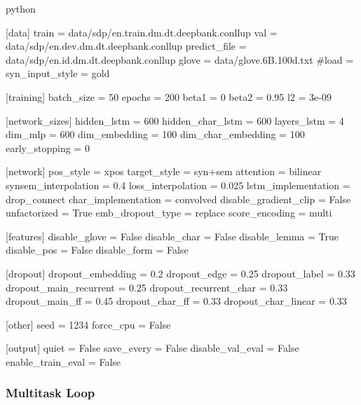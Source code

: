 \documentclass[11pt]{scrartcl}
\begin{document}
\begin{mintedbox}{python}

[data]
train                  = data/sdp/en.train.dm.dt.deepbank.conllup
val                    = data/sdp/en.dev.dm.dt.deepbank.conllup
predict_file           = data/sdp/en.id.dm.dt.deepbank.conllup
glove                  = data/glove.6B.100d.txt
#load                   = 
syn_input_style        = gold

[training]
batch_size             = 50
epochs                 = 200
beta1                  = 0
beta2                  = 0.95
l2                     = 3e-09

[network_sizes]
hidden_lstm            = 600
hidden_char_lstm       = 600
layers_lstm            = 4
dim_mlp                = 600
dim_embedding          = 100
dim_char_embedding     = 100
early_stopping         = 0

[network]
pos_style              = xpos
target_style           = syn+sem 
attention              = bilinear
synsem_interpolation   = 0.4
loss_interpolation     = 0.025
lstm_implementation    = drop_connect
char_implementation    = convolved
disable_gradient_clip  = False
unfactorized           = True
emb_dropout_type       = replace
score_encoding         = multi

[features]
disable_glove          = False
disable_char           = False
disable_lemma          = True
disable_pos            = False
disable_form           = False

[dropout]
dropout_embedding      = 0.2
dropout_edge           = 0.25
dropout_label          = 0.33
dropout_main_recurrent = 0.25
dropout_recurrent_char = 0.33
dropout_main_ff        = 0.45
dropout_char_ff        = 0.33
dropout_char_linear    = 0.33

[other]
seed                   = 1234
force_cpu              = False

[output]
quiet                  = False
save_every             = False
disable_val_eval       = False
enable_train_eval      = False


\end{mintedbox}

\subsubsection{Multitask Loop}
\end{document}
